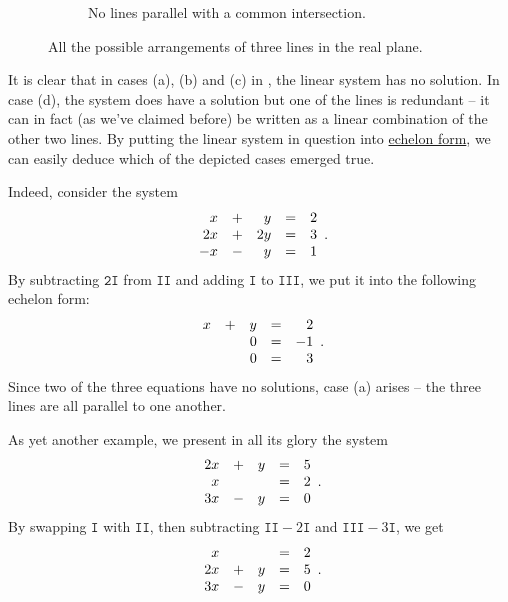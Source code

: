 \begin{figure}[ht]
\begin{subfigure}[t]{.45\textwidth}
  \caption{No lines parallel with a common intersection.}
 \end{subfigure}
 \caption{All the possible arrangements of three lines in the real plane.}
 \label{fig:arrangement-of-lines}
\end{figure}

It is clear that in cases (a), (b) and (c) in
, the linear system has no solution. In
case (d), the system does have a solution but one of the lines is redundant --
it can in fact (as we've claimed before) be written as a linear combination of
the other two lines. By putting the linear system in question into
\hyperref[def:echelon-form]{echelon form}, we can easily deduce which of the
depicted cases emerged true.

Indeed, consider the system
\[
 \begin{array}{r c r c r}
  x & + & y & = & 2\\
  2x & + & 2y & = & 3\\
  -x & - & y & = & 1
 \end{array}.
\]
By subtracting $\mathtt{2I}$ from $\mathtt{II}$ and adding $\mathtt{I}$ to
$\mathtt{III}$, we put it into the following echelon form:
\[
 \begin{array}{r c r c r}
  x & + & y & = & 2\\
    & & 0 & = & -1\\
    & & 0 & = & 3
 \end{array}.
\]
Since two of the three equations have no solutions, case (a) arises -- the three
lines are all parallel to one another.

As yet another example, we present in all its glory the system
\[
 \begin{array}{r c r c r}
  2x & + & y & = & 5\\
  x & & & = & 2\\
  3x & - & y & = & 0
 \end{array}.
\]
By swapping $\mathtt{I}$ with $\mathtt{II}$, then subtracting $\mathtt{II} -
2\mathtt{I}$ and $\mathtt{III} - 3\mathtt{I}$, we get
\[
 \begin{array}{r c r c r}
  x & & & = & 2\\
  2x & + & y & = & 5\\
  3x & - & y & = & 0
 \end{array}.
\]

